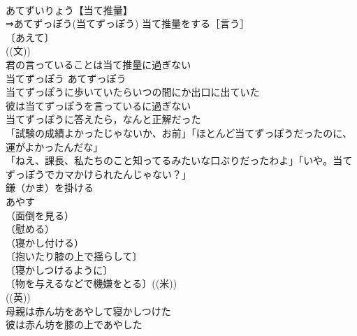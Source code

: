 \documentclass[8pt]{extreport}
\begin{document}
\begin{CJK}{UTF8}{min}
\\	あてずいりょう【当て推量】 
\\	⇒あてずっぽう(当てずっぽう) 当て推量をする［言う］ 
\\	〔あえて〕
\\	((文)) 
\\	君の言っていることは当て推量に過ぎない 
\\	当てずっぽう	あてずっぽう	
\\	当てずっぽうに歩いていたらいつの間にか出口に出ていた 
\\	彼は当てずっぽうを言っているに過ぎない 
\\	当てずっぽうに答えたら，なんと正解だった 
\\	「試験の成績よかったじゃないか、お前」「ほとんど当てずっぽうだったのに、運がよかったんだな」 
\\	「ねえ、課長、私たちのこと知ってるみたいな口ぶりだったわよ」「いや。当てずっぽうでカマかけられたんじゃない？」
\\	鎌（かま）を掛ける 
\\	あやす		
\\	（面倒を見る）
\\	（慰める）
\\	（寝かし付ける）
\\	〔抱いたり膝の上で揺らして〕
\\	〔寝かしつけるように〕
\\	〔物を与えるなどで機嫌をとる〕((米)) 
\\	((英)) 
\\	母親は赤ん坊をあやして寝かしつけた 
\\	彼は赤ん坊を膝の上であやした 
\end{CJK}
\end{document}
